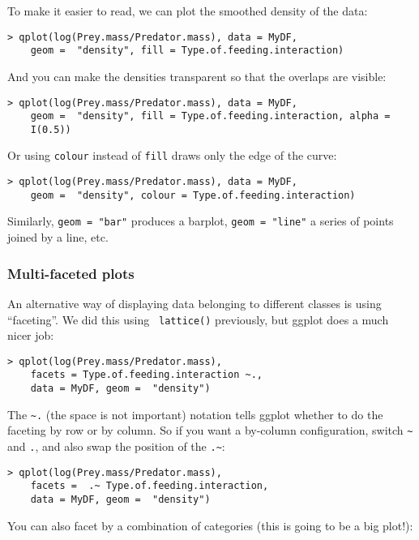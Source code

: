 To make it easier to read, we can plot the smoothed density of the 
data:

\begin{lstlisting}
> qplot(log(Prey.mass/Predator.mass), data = MyDF, 
	geom =  "density", fill = Type.of.feeding.interaction)
\end{lstlisting}

And you can make the densities transparent so that the overlaps are 
visible:

\begin{lstlisting}
> qplot(log(Prey.mass/Predator.mass), data = MyDF, 
	geom =  "density", fill = Type.of.feeding.interaction, alpha = 
	I(0.5))
\end{lstlisting}

Or using {\tt colour} instead of {\tt fill} draws only the edge of
the curve:
\begin{lstlisting}
> qplot(log(Prey.mass/Predator.mass), data = MyDF, 
	geom =  "density", colour = Type.of.feeding.interaction)
\end{lstlisting}

Similarly, {\tt geom = "bar"} produces a barplot, {\tt geom =
	"line"} a series of points joined by a line, etc.

\subsubsection{Multi-faceted plots}
An alternative way of displaying data belonging to different classes
is using ``faceting''. We did this using {\tt 
lattice()} previously, but ggplot does a much nicer job:

\begin{lstlisting}
> qplot(log(Prey.mass/Predator.mass), 
	facets = Type.of.feeding.interaction ~., 
	data = MyDF, geom =  "density")
\end{lstlisting}

The {\tt \textasciitilde .} (the space is not important) notation tells 
ggplot whether to do the faceting by row or by column. So if you want a 
by-column configuration, switch {\tt \textasciitilde} and {\tt .}, and 
also swap the position of the {\tt .\textasciitilde}:

\begin{lstlisting}
> qplot(log(Prey.mass/Predator.mass), 
	facets =  .~ Type.of.feeding.interaction, 
	data = MyDF, geom =  "density")
\end{lstlisting}

You can also facet by a combination of categories (this is going to be 
a big plot!):

